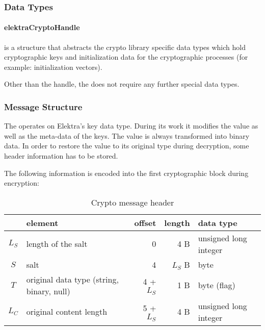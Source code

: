 \subsubsection{Data Types}

\paragraph{elektraCryptoHandle} is a structure that  abstracts the crypto
library specific data types which hold cryptographic keys and initialization
data for the cryptographic processes (for example: initialization vectors).

Other than the handle, the \crypto{} does not require any further
special data types.

\subsubsection{Message Structure}

The \crypto{} operates on Elektra's key data type. During its work it modifies
the value as well as the meta-data of the keys. The value is always
transformed into binary data. In order to restore the value to its original
type during decryption, some header information has to be stored.

The following information is encoded into the first cryptographic block during
encryption:

\begin{table}[h!]
\centering
\caption{Crypto message header}
\label{my-label}
\begin{tabular}{clrrl}
	\textbf{} & \textbf{element}                          & \textbf{offset} & \textbf{length} & \textbf{data type}    \\ \hline
	$L_S$     & length of the salt                        & 0               & 4 B             & unsigned long integer \\
	$S$       & salt                                      & 4               & $L_S$ B         & byte                  \\
	$T$       & original data type (string, binary, null) & 4 + $L_S$       & 1 B             & byte (flag)           \\
	$L_C$     & original content length                   & 5 + $L_S$       & 4 B             & unsigned long integer \\ \hline
\end{tabular}
\end{table}

